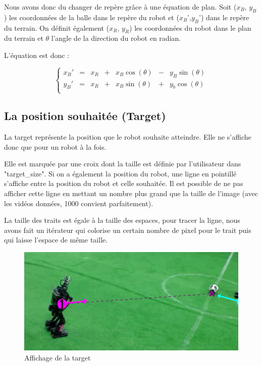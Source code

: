Nous avons donc du changer de repère grâce à une équation de 
plan.
\newpage
Soit ($x_B$, $y_B$) les coordonnées de la balle dans le repère du
robot et ($x_B$',$y_B$') dans le repère du terrain. On définit 
également ($x_R$, $y_R$) les coordonnées du robot dans le plan du
terrain et $\theta$ l'angle de la direction du robot en radian. 

L'équation est donc :
\bigskip

\[\left\{
  \begin{array}{ccccccc}
    x_B'& =& x_R &+& x_B \cos(\theta)& - & y_B \sin(\theta)\\
    y_B' &= & x_R &+& x_B \sin(\theta)& +& y_b \cos(\theta)\\
  \end{array}
\right.
\]    

\subsection{La position souhaitée (Target)}

La target représente la position que le robot souhaite atteindre.
Elle ne s'affiche donc que pour un robot à la fois.
\bigskip

Elle est marquée par une croix dont la taille est définie par
l'utilisateur dans "target\_size". Si on a également la position
du robot, une ligne en pointillé s'affiche entre la position du
robot et celle souhaitée. 
Il est possible de ne pas afficher cette ligne en mettant un
nombre plus grand que la taille de l'image (avec les vidéos
données, 1000 convient parfaitement).
\bigskip

La taille des traits est égale à la taille des espaces, pour
tracer la ligne, nous avons fait un itérateur qui colorise un
certain nombre de pixel pour le trait puis qui laisse l'espace de
même taille.


\begin{figure}[h] 
\centering 
\includegraphics[scale = 0.5]{images/robottarget.png}
    \caption{Affichage de la target}
    \label{fig:target}
\end{figure}
\newpage


